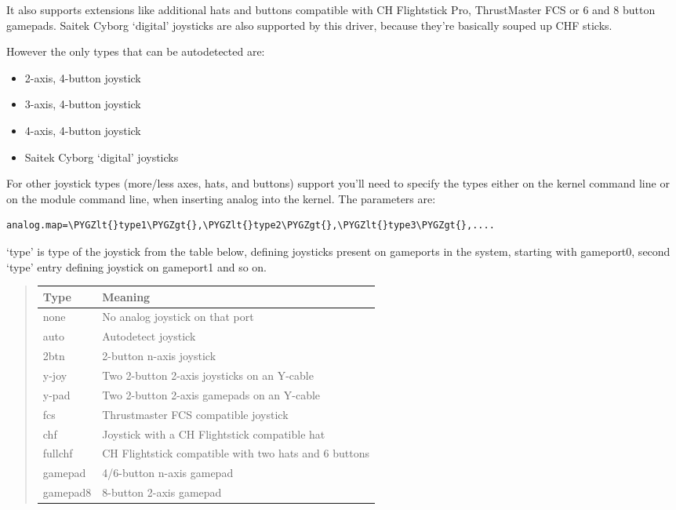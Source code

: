 \documentclass[a4paper,8pt,english]{sphinxmanual}
\def\PYGZlt{\char`\<}
\def\PYGZgt{\char`\>}
\begin{document}
It also supports extensions like additional hats and buttons compatible
with CH Flightstick Pro, ThrustMaster FCS or 6 and 8 button gamepads. Saitek
Cyborg `digital' joysticks are also supported by this driver, because
they're basically souped up CHF sticks.

However the only types that can be autodetected are:
\begin{itemize}
\item {} 
2-axis, 4-button joystick

\item {} 
3-axis, 4-button joystick

\item {} 
4-axis, 4-button joystick

\item {} 
Saitek Cyborg `digital' joysticks

\end{itemize}

For other joystick types (more/less axes, hats, and buttons) support
you'll need to specify the types either on the kernel command line or on the
module command line, when inserting analog into the kernel. The
parameters are:

\begin{Verbatim}[commandchars=\\\{\}]
analog.map=\PYGZlt{}type1\PYGZgt{},\PYGZlt{}type2\PYGZgt{},\PYGZlt{}type3\PYGZgt{},....
\end{Verbatim}

`type' is type of the joystick from the table below, defining joysticks
present on gameports in the system, starting with gameport0, second `type'
entry defining joystick on gameport1 and so on.
\begin{quote}

\begin{tabulary}{\linewidth}{|L|L|}
\hline
\textsf{\relax 
Type
} & \textsf{\relax 
Meaning
}\\
\hline
none
 & 
No analog joystick on that port
\\
\hline
auto
 & 
Autodetect joystick
\\
\hline
2btn
 & 
2-button n-axis joystick
\\
\hline
y-joy
 & 
Two 2-button 2-axis joysticks on an Y-cable
\\
\hline
y-pad
 & 
Two 2-button 2-axis gamepads on an Y-cable
\\
\hline
fcs
 & 
Thrustmaster FCS compatible joystick
\\
\hline
chf
 & 
Joystick with a CH Flightstick compatible hat
\\
\hline
fullchf
 & 
CH Flightstick compatible with two hats and 6 buttons
\\
\hline
gamepad
 & 
4/6-button n-axis gamepad
\\
\hline
gamepad8
 & 
8-button 2-axis gamepad
\\
\hline\end{tabulary}

\end{quote}
\end{document}

